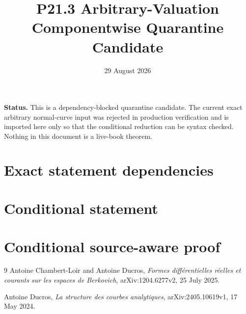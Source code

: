 \documentclass[11pt]{article}
\title{P21.3 Arbitrary-Valuation Componentwise Quarantine Candidate}
\author{}
\date{29 August 2026}
\theoremstyle{remark}
\begin{document}
\maketitle

\noindent\textbf{Status.}
This is a dependency-blocked quarantine candidate.  The current exact
arbitrary normal-curve input was rejected in production verification and
is imported here only so that the conditional reduction can be syntax
checked.  Nothing in this document is a live-book theorem.

\section*{Exact statement dependencies}







\section*{Conditional statement}



\section*{Conditional source-aware proof}



\begin{thebibliography}{9}
Antoine Chambert-Loir and Antoine Ducros,
\emph{Formes diff\'erentielles r\'eelles et courants sur les espaces de
Berkovich}, arXiv:1204.6277v2, 25 July 2025.

Antoine Ducros,
\emph{La structure des courbes analytiques},
arXiv:\allowbreak 2405.10619v1, 17 May 2024.
\end{thebibliography}
\end{document}
